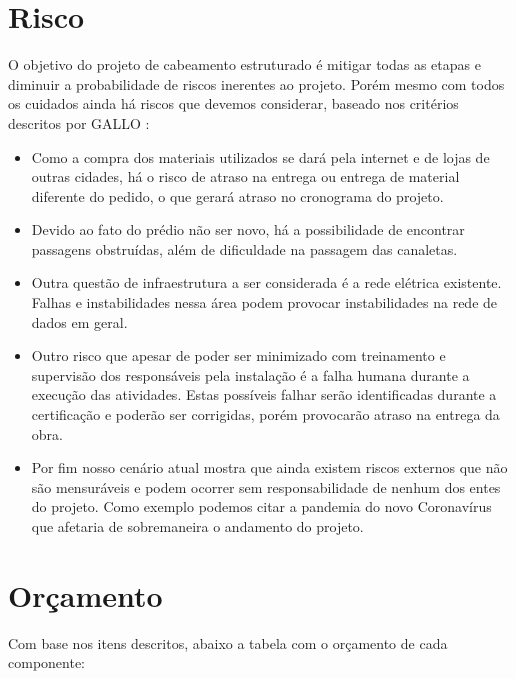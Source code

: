 \documentclass[	DIV=calc,%
							paper=a4,%
							fontsize=12pt,%
							onecolumn]{scrartcl}	 					%
\begin{document}
\section{Risco}
O objetivo do projeto de cabeamento estruturado é mitigar todas as etapas e diminuir a probabilidade de riscos inerentes ao projeto. Porém mesmo com todos os cuidados ainda há riscos que devemos considerar, baseado nos critérios descritos por GALLO \cite{GALLO}:
\begin{itemize}
\item Como a compra dos materiais utilizados se dará pela internet e de lojas de outras cidades, há o risco de atraso na entrega ou entrega de material diferente do pedido, o que gerará atraso no cronograma do projeto.

\item Devido ao fato do prédio não ser novo, há a possibilidade de encontrar passagens obstruídas, além de dificuldade na passagem das canaletas.

\item Outra questão de infraestrutura a ser considerada é a rede elétrica existente. Falhas e instabilidades nessa área podem provocar instabilidades na rede de dados em geral.

\item Outro risco que apesar de poder ser minimizado com treinamento e supervisão dos responsáveis pela instalação é a falha humana durante a execução das atividades. Estas possíveis falhar serão identificadas durante a certificação e poderão ser corrigidas, porém provocarão atraso na entrega da obra. 

\item Por fim nosso cenário atual mostra que ainda existem riscos externos que não são mensuráveis e podem ocorrer sem responsabilidade de nenhum dos entes do projeto. Como exemplo podemos citar a pandemia do novo Coronavírus que afetaria de sobremaneira o andamento do projeto.
\end{itemize}

\section{Orçamento}
Com base nos itens descritos, abaixo a tabela com o orçamento de cada componente:

\end{document}
